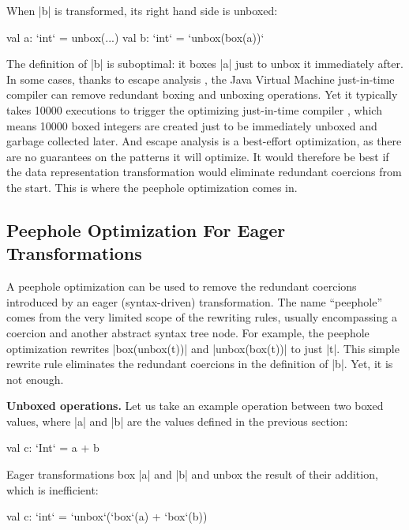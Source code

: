 When |b| is transformed, its right hand side is unboxed:

\begin{lstlisting-nobreak}
 val a: `int` = unbox(...)
 val b: `int` = `unbox(box(a))`
\end{lstlisting-nobreak}

The definition of |b| is suboptimal: it boxes |a| just to unbox it immediately after. In some cases, thanks to escape analysis \cite{stadler-escape-analysis}, the Java Virtual Machine just-in-time compiler \cite{hotspot-c1, hotspot-c2} can remove redundant boxing and unboxing operations. Yet it typically takes 10000 executions to trigger the optimizing just-in-time compiler \cite{hotspot-c2-thresholds}, which means 10000 boxed integers are created just to be immediately unboxed and garbage collected later. And escape analysis is a best-effort optimization, as there are no guarantees on the patterns it will optimize. It would therefore be best if the data representation transformation would eliminate redundant coercions from the start. This is where the peephole optimization comes in.

\subsection{Peephole Optimization For Eager Transformations}
\label{sec:problem/peephole}

A peephole optimization \cite{spj-unboxed-values, miniboxing} can be used to remove the redundant coercions introduced by an eager (syntax-driven) transformation. The name ``peephole'' comes from the very limited scope of the rewriting rules, usually encompassing a coercion and another abstract syntax tree node. For example, the peephole optimization rewrites |box(unbox(t))| and |unbox(box(t))| to just |t|. This simple rewrite rule eliminates the redundant coercions in the definition of |b|. Yet, it is not enough.

\textbf{Unboxed operations.} Let us take an example operation between two boxed values, where |a| and |b| are the values defined in the previous section:

\begin{lstlisting-nobreak}
 val c: `Int` = a + b
\end{lstlisting-nobreak}

Eager transformations box |a| and |b| and unbox the result of their addition, which is inefficient:

\begin{lstlisting-nobreak}
 val c: `int` = `unbox`(`box`(a) + `box`(b))
\end{lstlisting-nobreak}

